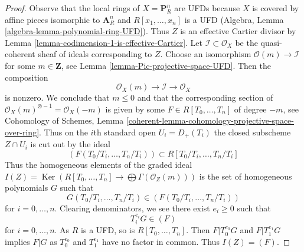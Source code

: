 \documentclass[10pt,a4paper]{amsart}
\theoremstyle{plain}
\theoremstyle{definition}
\theoremstyle{remark}
\numberwithin{equation}{subsection}
\def\Ker{\mathop{\mathrm{Ker}}}
\begin{document}
\begin{proof}
Observe that the local rings of $X = \mathbf{P}^n_R$ are
UFDs because $X$ is covered by affine pieces isomorphic
to $\mathbf{A}^n_R$ and $R[x_1, \ldots, x_n]$ is a UFD
(Algebra, Lemma \ref{algebra-lemma-polynomial-ring-UFD}).
Thus $Z$ is an effective Cartier divisor by
Lemma \ref{lemma-codimension-1-is-effective-Cartier}.
Let $\mathcal{I} \subset \mathcal{O}_X$ be the quasi-coherent
sheaf of ideals corresponding to $Z$.
Choose an isomorphism $\mathcal{O}(m) \to \mathcal{I}$
for some $m \in \mathbf{Z}$, see
Lemma \ref{lemma-Pic-projective-space-UFD}.
Then the composition
$$
\mathcal{O}_X(m) \to \mathcal{I} \to \mathcal{O}_X
$$
is nonzero. We conclude that $m \leq 0$ and that the corresponding
section of $\mathcal{O}_X(m)^{\otimes -1} = \mathcal{O}_X(-m)$
is given by some $F \in R[T_0, \ldots, T_n]$ of degree $-m$, see
Cohomology of Schemes, Lemma
\ref{coherent-lemma-cohomology-projective-space-over-ring}.
Thus on the $i$th standard open $U_i = D_+(T_i)$ the
closed subscheme $Z \cap U_i$ is cut out by the ideal
$$
(F(T_0/T_i, \ldots, T_n/T_i)) \subset R[T_0/T_i, \ldots, T_n/T_i]
$$
Thus the homogeneous elements of the graded ideal
$I(Z) = \Ker(R[T_0, \ldots, T_n] \to \bigoplus \Gamma(\mathcal{O}_Z(m)))$
is the set of homogeneous polynomials $G$ such that
$$
G(T_0/T_i, \ldots, T_n/T_i) \in (F(T_0/T_i, \ldots, T_n/T_i))
$$
for $i = 0, \ldots, n$. Clearing denominators, we see there exist
$e_i \geq 0$ such that
$$
T_i^{e_i}G \in (F)
$$
for $i = 0, \ldots, n$. As $R$ is a UFD, so is $R[T_0, \ldots, T_n]$.
Then $F | T_0^{e_0}G$ and $F | T_1^{e_1}G$ implies $F | G$ as
$T_0^{e_0}$ and $T_1^{e_1}$ have no factor in common. Thus $I(Z) = (F)$.
\end{proof}
\end{document}
